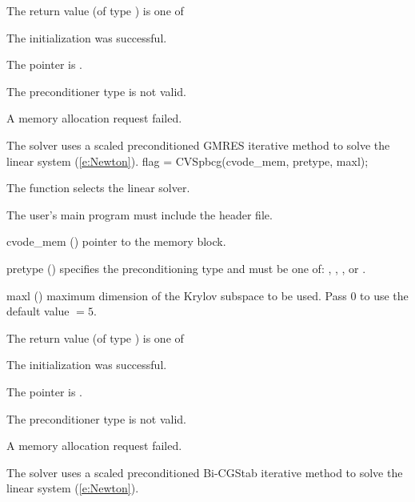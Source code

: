 {
  The return value  (of type ) is one of
  \begin{args}
  \item[\Id{CVSPILS\_SUCCESS}] 
    The {\cvspgmr} initialization was successful.
  \item[\Id{CVSPILS\_MEM\_NULL}]
    The  pointer is .
  \item[\Id{CVSPILS\_ILL\_INPUT}]
    The preconditioner type  is not valid.
  \item[\Id{CVSPILS\_MEM\_FAIL}]
    A memory allocation request failed.
  \end{args}
}
{
  The {\cvspgmr} solver uses a scaled preconditioned GMRES
  iterative method to solve the linear system (\ref{e:Newton}).
}
{
  flag = CVSpbcg(cvode\_mem, pretype, maxl);
}
{
  The function  selects the {\cvspbcg} linear solver. 

  The user's main program must include the  header file.
}
{
  \begin{args}
  \item[cvode\_mem] ()
    pointer to the {\cvode} memory block.
  \item[pretype] ()
    specifies the preconditioning type and must be one of: 
    , , , or .
  \item[maxl] ()
    maximum dimension of the Krylov subspace to be used. Pass $0$ to use the 
    default value  $= 5$.
  \end{args}
}
{
  The return value  (of type ) is one of
  \begin{args}
  \item[\Id{CVSPILS\_SUCCESS}] 
    The {\cvspbcg} initialization was successful.
  \item[\Id{CVSPILS\_MEM\_NULL}]
    The  pointer is .
  \item[\Id{CVSPILS\_ILL\_INPUT}]
    The preconditioner type  is not valid.
  \item[\Id{CVSPILS\_MEM\_FAIL}]
    A memory allocation request failed.
  \end{args}
}
{
  The {\cvspbcg} solver uses a scaled preconditioned Bi-CGStab
  iterative method to solve the linear system (\ref{e:Newton}).
}
